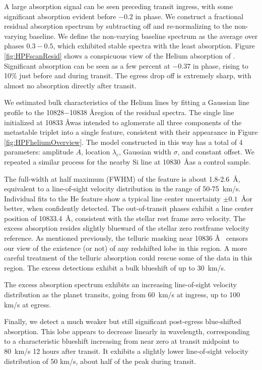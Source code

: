 \documentclass[twocolumn]{aastex631}
\begin{document}
A large absorption signal can be seen preceding transit ingress, with some significant absorption evident before $-0.2$ in phase.  We construct a fractional residual absorption spectrum by subtracting off and re-normalizing to the non-varying baseline.  We define the non-varying baseline spectrum as the average over phases $0.3-0.5$, which exhibited stable spectra with the least absorption.  Figure \ref{fig:HPFscanResid} shows a conspicuous view of the Helium absorption of .  Significant absorption can be seen as a few percent at $-0.37$ in phase, rising to 10\% just before and during transit.  The egress drop off is extremely sharp, with almost no absorption directly after transit.


We estimated bulk characteristics of the Helium lines by fitting a Gaussian line profile to the 10828$-$10838 \AA region of the residual spectra.  The single line initialized at 10833 \AA was intended to aglomerate all three components of the metastable triplet into a single feature, consistent with their appearance in Figure \ref{fig:HPFheliumOverview}.  The model constructed in this way has a total of 4 parameters: amplitude $A$, location $\lambda_c$, Gaussian width $\sigma$, and constant offset.  We repeated a similar process for the nearby Si line at 10830~\AA as a control sample.

The full-width at half maximum (FWHM) of the feature is about 1.8-2.6~\AA, equivalent to a line-of-sight velocity distribution in the range of 50-75~km/s.  Individual fits to the He feature show a typical line center uncertainty $\pm0.1$~\AA or better, when confidently detected.  The out-of-transit phases exhibit a line center position of 10833.4~\AA, consistent with the stellar  rest frame zero velocity.  The excess absorption resides slightly blueward of the stellar zero restframe velocity reference.  As mentioned previously, the telluric masking near 10836 \AA~ censors our view of the existence (or not) of any redshifted lobe in this region.  A more careful treatment of the telluric absorption could rescue some of the data in this region.  The excess detections exhibit a bulk blueshift of up to 30~km/s.

The excess absorption spectrum exhibits an increasing line-of-sight velocity distribution as the planet transits, going from 60~km/s at ingress, up to 100 km/s at egress.

Finally, we detect a much weaker but still significant post-egress blue-shifted absorption.  This lobe appears to decrease linearly in wavelength, corresponding to a characteristic blueshift increasing from near zero at transit midpoint to 80~km/s 12 hours after transit.  It exhibits a slightly lower line-of-sight velocity distribution of 50 km/s, about half of the peak during transit.
\end{document}
